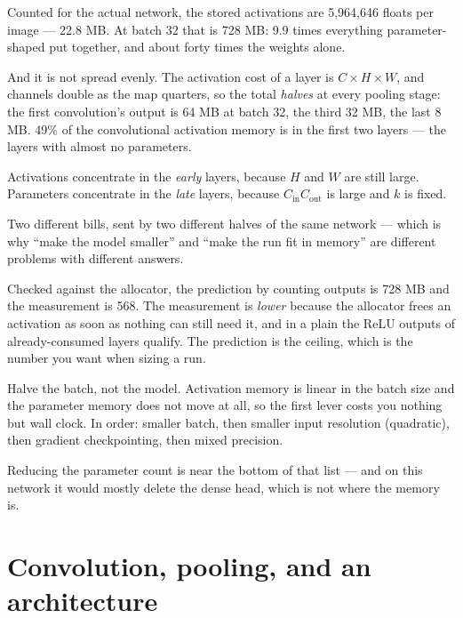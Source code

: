 \documentclass[11pt,a4paper]{article}
\begin{document}
Counted for the actual network, the stored activations are 5{,}964{,}646 floats
per image --- 22.8 MB. At batch 32 that is 728 MB: 9.9 times everything
parameter-shaped put together, and about forty times the weights alone.

And it is not spread evenly. The activation cost of a layer is $C\times H\times
W$, and channels double as the map quarters, so the total \emph{halves} at
every pooling stage: the first convolution's output is 64 MB at batch 32, the
third 32 MB, the last 8 MB. 49\% of the convolutional activation memory is in
the first two layers --- the layers with almost no parameters.

\begin{keybox}[title={Parameters and activations live at opposite ends}]
Activations concentrate in the \emph{early} layers, because $H$ and $W$ are
still large. Parameters concentrate in the \emph{late} layers, because
$C_{\text{in}}C_{\text{out}}$ is large and $k$ is fixed.

Two different bills, sent by two different halves of the same network --- which
is why ``make the model smaller'' and ``make the run fit in memory'' are
different problems with different answers.
\end{keybox}

Checked against the allocator, the prediction by counting outputs is 728 MB and
the measurement is 568. The measurement is \emph{lower} because the allocator
frees an activation as soon as nothing can still need it, and in a plain
 the ReLU outputs of already-consumed layers qualify. The
prediction is the ceiling, which is the number you want when sizing a run.

\begin{keybox}[title={When a run runs out of memory}]
Halve the batch, not the model. Activation memory is linear in the batch size
and the parameter memory does not move at all, so the first lever costs you
nothing but wall clock. In order: smaller batch, then smaller input resolution
(quadratic), then gradient checkpointing, then mixed precision.

Reducing the parameter count is near the bottom of that list --- and on this
network it would mostly delete the dense head, which is not where the memory
is.
\end{keybox}

\section{Convolution, pooling, and an architecture}
\end{document}
